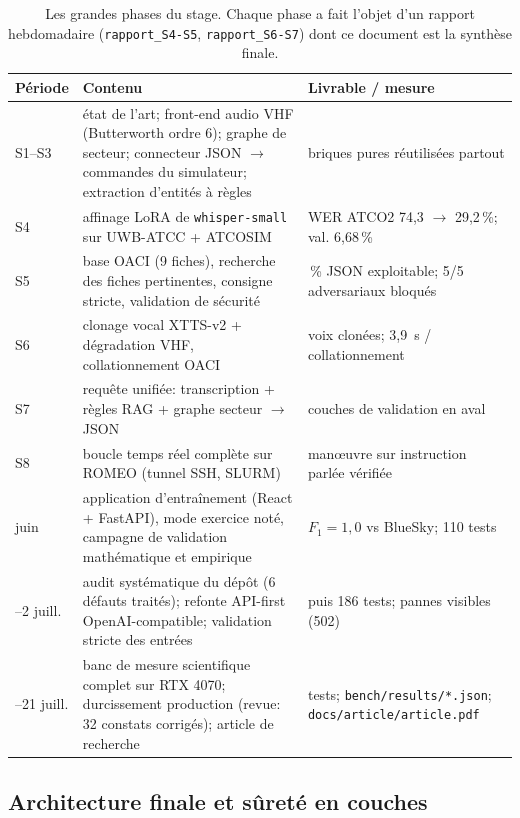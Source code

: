 \documentclass[11pt,a4paper]{article}
\begin{document}
\begin{table}[!htbp]
\centering
\caption[Les grandes phases du stage]{Les grandes phases du stage. Chaque phase a fait l'objet d'un rapport hebdomadaire
(\texttt{rapport\_S4-S5}, \texttt{rapport\_S6-S7}) dont ce document est la synthèse finale.}
\label{tab:chrono}
\small
\begin{tabular}{>{\raggedright\arraybackslash}p{2.2cm} >{\raggedright\arraybackslash}p{7.6cm} >{\raggedright\arraybackslash}p{5.2cm}}
\toprule
\rowcolor{lightgray}\textbf{Période} & \textbf{Contenu} & \textbf{Livrable / mesure}\\
\midrule
S1--S3 & état de l'art; front-end audio VHF (Butterworth ordre 6); graphe de secteur; connecteur JSON $\rightarrow$ commandes du simulateur; extraction d'entités à règles & briques pures réutilisées partout\\
S4 & affinage LoRA de \texttt{whisper-small} sur UWB-ATCC + ATCOSIM & WER ATCO2 74,3 $\rightarrow$ 29,2\,\%; val. 6,68\,\%\\
S5 & base OACI (9 fiches), recherche des fiches pertinentes, consigne stricte, validation de sécurité & 100\,\% JSON exploitable; 5/5 adversariaux bloqués\\
S6 & clonage vocal XTTS-v2 + dégradation VHF, collationnement OACI & 3 voix clonées; 3,9~s / collationnement\\
S7 & requête unifiée: transcription + règles RAG + graphe secteur $\rightarrow$ JSON & 4 couches de validation en aval\\
S8 & boucle temps réel complète sur ROMEO (tunnel SSH, SLURM) & man\oe uvre sur instruction parlée vérifiée\\
11 juin & application d'entraînement (React + FastAPI), mode exercice noté, campagne de validation mathématique et empirique & $F_1{=}1{,}0$ vs BlueSky; 110 tests\\
1--2 juill. & audit systématique du dépôt (6 défauts traités); refonte API-first OpenAI-compatible; validation stricte des entrées & 148 puis 186 tests; pannes visibles (502)\\
10--21 juill. & banc de mesure scientifique complet sur RTX 4070; durcissement production (revue: 32 constats corrigés); article de recherche & 209 tests; \texttt{bench/results/*.json}; \texttt{docs/article/article.pdf}\\
\bottomrule
\end{tabular}
\end{table}

\subsection{Architecture finale et sûreté en couches}
\label{sec:surete}
\end{document}
